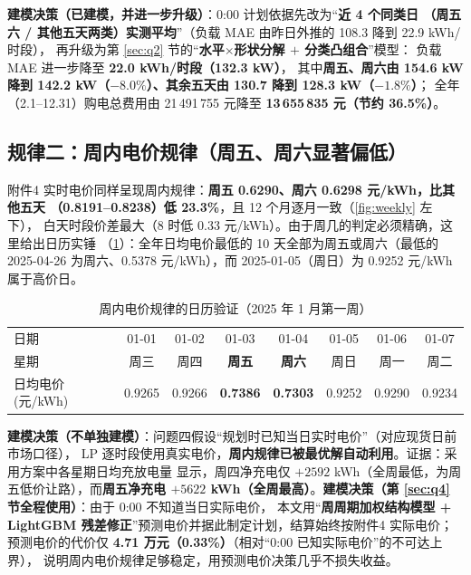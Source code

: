 \documentclass[12pt,a4paper,fontset=fandol]{ctexart}
\begin{document}
\textbf{建模决策（已建模\nobreak，并进一步升级\nobreak）}\nobreak：0:00 计划依据先改为“\textbf{近 4 个同类日
（周五六 / 其他五天两类\nobreak）实测平均}\nobreak”（负载 MAE 由昨日外推的 108.3 降到 22.9 kWh/时段\nobreak）\nobreak，
再升级为第 \ref{sec:q2} 节的“\textbf{水平$\times$形状分解 $+$ 分类凸组合}\nobreak”模型\nobreak：
负载 MAE 进一步降至 \textbf{22.0 kWh/时段（132.3 kW\nobreak）}\nobreak，
其中\textbf{周五\nobreak、周六由 154.6 kW 降到 142.2 kW（$-8.0\%$\nobreak）\nobreak、其余五天由 130.7 降到 128.3 kW（$-1.8\%$\nobreak）}\nobreak；
全年（2.1--12.31\nobreak）购电总费用由 21\,491\,755 元降至 \textbf{13\,655\,835 元（节约 36.5\%\nobreak）}\nobreak。

\subsection{规律二\nobreak：周内电价规律（周五\nobreak、周六显著偏低\nobreak）}

附件4 实时电价同样呈现周内规律\nobreak：\textbf{周五 0.6290\nobreak、周六 0.6298 元/kWh\nobreak，比其他五天
（0.8191--0.8238\nobreak）低 23.3\%}\nobreak，且 12 个月逐月一致（\cref{fig:weekly} 左下\nobreak）\nobreak，
白天时段价差最大（8 时低 0.33 元/kWh\nobreak）\nobreak。由于周几的判定必须精确\nobreak，这里给出日历实锤
（\cref{tab:calendar}\nobreak）\nobreak：全年日均电价最低的 10 天全部为周五或周六（最低的
2025-04-26 为周六\nobreak、0.5378 元/kWh\nobreak）\nobreak，而 2025-01-05（周日\nobreak）为 0.9252 元/kWh 属于高价日\nobreak。

\begin{table}[htbp]
\centering
\caption{周内电价规律的日历验证（2025 年 1 月第一周\nobreak）}
\label{tab:calendar}
\begin{tabular}{@{}lccccccc@{}}
\toprule
日期 & 01-01 & 01-02 & 01-03 & 01-04 & 01-05 & 01-06 & 01-07 \\
星期 & 周三 & 周四 & \textbf{周五} & \textbf{周六} & 周日 & 周一 & 周二 \\
日均电价(元/kWh) & 0.9265 & 0.9266 & \textbf{0.7386} & \textbf{0.7303} & 0.9252 & 0.9290 & 0.9234 \\
\bottomrule
\end{tabular}
\end{table}

\textbf{建模决策（不单独建模\nobreak）}\nobreak：问题四假设“规划时已知当日实时电价\nobreak”（对应现货日前市场口径\nobreak）\nobreak，
LP 逐时段使用真实电价\nobreak，\textbf{周内规律已被最优解自动利用}\nobreak。证据\nobreak：采用方案中各星期日均充放电量
显示\nobreak，周四净充电仅 $+2592$ kWh（全周最低\nobreak，为周五低价让路\nobreak）\nobreak，而\textbf{周五净充电
$+5622$ kWh（全周最高\nobreak）}\nobreak。\textbf{建模决策（第 \ref{sec:q4} 节全程使用）}\nobreak：由于 0:00 不知道当日实际电价\nobreak，
本文用“\textbf{周周期加权结构模型 + LightGBM 残差修正\nobreak}”预测电价并据此制定计划\nobreak，结算始终按附件4 实际电价\nobreak；
预测电价的代价仅 \textbf{4.71 万元（0.33\%\nobreak）}（相对“0:00 已知实际电价\nobreak”的不可达上界）\nobreak，
说明周内电价规律足够稳定\nobreak，用预测电价决策几乎不损失收益\nobreak。
\end{document}

